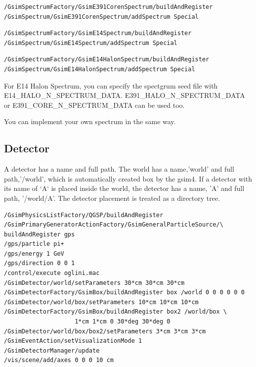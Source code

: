 \documentclass[a4paper,12pt]{article}
\begin{document}
     \begin{screen}
  \begin{verbatim}
/GsimSpectrumFactory/GsimE391CorenSpectrum/buildAndRegister
/GsimSpectrum/GsimE391CorenSpectrum/addSpectrum Special  \end{verbatim}
 \end{screen}

  \begin{screen}
  \begin{verbatim}
/GsimSpectrumFactory/GsimE14Spectrum/buildAndRegister
/GsimSpectrum/GsimE14Spectrum/addSpectrum Special  \end{verbatim}
 \end{screen}

   \begin{screen}
  \begin{verbatim}
/GsimSpectrumFactory/GsimE14HalonSpectrum/buildAndRegister
/GsimSpectrum/GsimE14HalonSpectrum/addSpectrum Special  \end{verbatim}
 \end{screen}
 For E14 Halon Spectrum, you can specify the spectgrum seed file with
 E14\_HALO\_N\_SPECTRUM\_DATA. E391\_HALO\_N\_SPECTRUM\_DATA or
 E391\_CORE\_N\_SPECTRUM\_DATA can be used too.
 
 You can implement your own spectrum in the same way.
 
 \subsection{Detector}
 A detector has a name and full path.
 The world has a name,'world' and full path,'/world', which is
 automatically created box by the gsim4.
 If a detector with its name of `A` is placed inside the world,
 the detector has a name, 'A' and full path, '/world/A'.
 The detector placement is treated as a directory tree.

 \begin{screen}
  \begin{verbatim}
/GsimPhysicsListFactory/QGSP/buildAndRegister 
/GsimPrimaryGeneratorActionFactory/GsimGeneralParticleSource/\
buildAndRegister gps
/gps/particle pi+
/gps/energy 1 GeV
/gps/direction 0 0 1
/control/execute oglini.mac
/GsimDetector/world/setParameters 30*cm 30*cm 30*cm
/GsimDetectorFactory/GsimBox/buildAndRegister box /world 0 0 0 0 0 0
/GsimDetector/world/box/setParameters 10*cm 10*cm 10*cm
/GsimDetectorFactory/GsimBox/buildAndRegister box2 /world/box \
                    1*cm 1*cm 0 30*deg 30*deg 0
/GsimDetector/world/box/box2/setParameters 3*cm 3*cm 3*cm
/GsimEventAction/setVisualizationMode 1	
/GsimDetectorManager/update
/vis/scene/add/axes 0 0 0 10 cm\end{verbatim}
 \end{screen}
\end{document}
